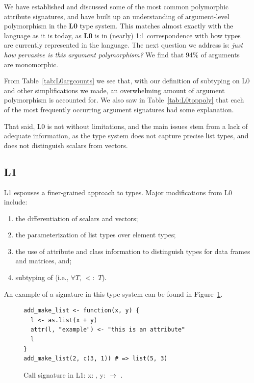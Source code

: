 \documentclass[acmsmall,10pt,review,anonymous]{acmart}\settopmatter{printfolios=true,printccs=false,printacmref=false}
\begin{document}
We have established and discussed some of the most common polymorphic
attribute signatures, and have built up an understanding of argument-level
polymorphism in the {\bf L0} type system.  This matches almost exactly with
the language as it is today, as {\bf L0} is in (nearly) 1:1 correspondence
with how types are currently represented in the language.  The next question
we address is: {\it just how pervasive is this argument polymorphism?}
We find that 94\% of arguments are monomorphic.

From Table~\ref{tab:L0argcounts} we see that, with our definition of
subtyping on L0 and other simplifications we made, an overwhelming amount of
argument polymorphism is accounted for.  We also saw in
Table~\ref{tab:L0toppoly} that each of the most frequently occurring
argument signatures had some explanation.

That said, L0 is not without limitations, and the main issues stem from a
lack of adequate information, as the type system does not capture precise
list types, and does not distinguish scalars from vectors. 


%
%
\subsection{L1}

L1 espouses a finer-grained approach to types.  Major modifications from L0
include:

\begin{enumerate}
	\item the differentiation of scalars and vectors;
	\item the parameterization of list types over element types;
	\item the use of attribute and class information to distinguish types for data frames and matrices, and;
	\item subtyping of \sN (i.e., $\forall T$, \sN $<:$ $T$).
\end{enumerate}

An example of a signature in this type system can be found in
Figure~\ref{fig:exL1}.

\begin{figure}[!hb]{\small\begin{lstlisting}[style=R]
add_make_list <- function(x, y) {
  l <- as.list(x + y)
  attr(l, "example") <- "this is an attribute"
  l
}
add_make_list(2, c(3, 1)) # => list(5, 3)
\end{lstlisting}}
\caption{Call signature in L1: x: \sD, y: \D $\rightarrow$ .}\label{fig:exL1}\end{figure}
\end{document}
